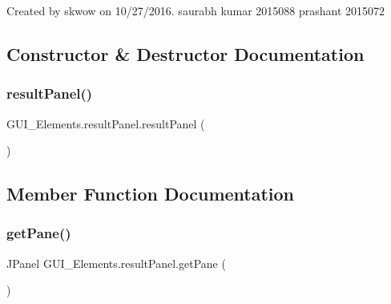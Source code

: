 Created by skwow on 10/27/2016. saurabh kumar 2015088 prashant 2015072 

\subsection{Constructor \& Destructor Documentation}
\hypertarget{class_g_u_i___elements_1_1result_panel_ae3658e3ae9e9685a8313ddc8f76426bf}{}\label{class_g_u_i___elements_1_1result_panel_ae3658e3ae9e9685a8313ddc8f76426bf} 
\subsubsection{\texorpdfstring{result\+Panel()}{resultPanel()}}
{\footnotesize\ttfamily G\+U\+I\+\_\+\+Elements.\+result\+Panel.\+result\+Panel (\begin{DoxyParamCaption}{ }\end{DoxyParamCaption})}



\subsection{Member Function Documentation}
\hypertarget{class_g_u_i___elements_1_1result_panel_ad5c462dff38294c96ee565dc5f258566}{}\label{class_g_u_i___elements_1_1result_panel_ad5c462dff38294c96ee565dc5f258566} 
\subsubsection{\texorpdfstring{get\+Pane()}{getPane()}}
{\footnotesize\ttfamily J\+Panel G\+U\+I\+\_\+\+Elements.\+result\+Panel.\+get\+Pane (\begin{DoxyParamCaption}{ }\end{DoxyParamCaption})}

\hypertarget{class_g_u_i___elements_1_1result_panel_abba17e8bbb434ee86c7f95d00167c99d}{}\label{class_g_u_i___elements_1_1result_panel_abba17e8bbb434ee86c7f95d00167c99d} 
